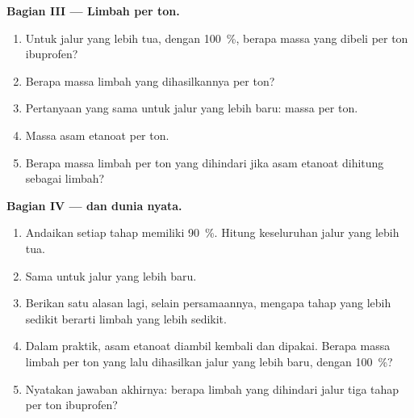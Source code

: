 \begin{problem}
\medskip
\noindent\textbf{Bagian III --- Limbah per ton.}
\begin{enumerate}[resume]
  \item Untuk jalur yang lebih tua, dengan  \qty{100}{\percent},
        berapa massa  yang dibeli per ton ibuprofen?
  \item Berapa massa limbah yang dihasilkannya per ton?
  \item Pertanyaan yang sama untuk jalur yang lebih baru: massa 
        per ton.
  \item Massa asam etanoat per ton.
  \item Berapa massa limbah per ton yang dihindari jika asam etanoat
        dihitung sebagai limbah?
\end{enumerate}

\medskip
\noindent\textbf{Bagian IV ---  dan dunia nyata.}
\begin{enumerate}[resume]
  \item Andaikan setiap tahap memiliki  \qty{90}{\percent}.
        Hitung  keseluruhan jalur yang lebih tua.
  \item Sama untuk jalur yang lebih baru.
  \item Berikan satu alasan lagi, selain persamaannya, mengapa tahap
        yang lebih sedikit berarti limbah yang lebih sedikit.
  \item Dalam praktik, asam etanoat diambil kembali dan dipakai. Berapa
        massa limbah per ton yang lalu dihasilkan jalur yang lebih baru,
        dengan  \qty{100}{\percent}?
  \item Nyatakan jawaban akhirnya: berapa limbah yang dihindari jalur
        tiga tahap per ton ibuprofen?
\end{enumerate}
\end{problem}
